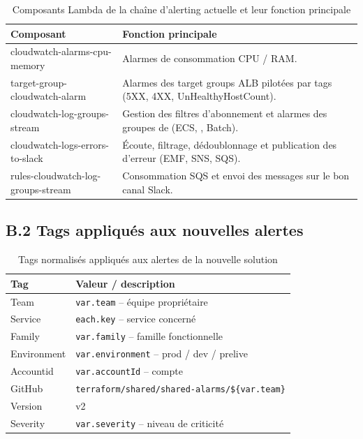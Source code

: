 \begin{table}[h]
	\centering
	\caption{Composants Lambda de la chaîne d'alerting actuelle et leur fonction principale}
	\label{tab:annexe-composants-lambda}
	\begin{tabular}{|p{}|p{}|}
		\hline
		\textbf{Composant} & \textbf{Fonction principale} \\
		\hline
		cloudwatch-alarms-cpu-memory & Alarmes de consommation CPU / RAM. \\
		\hline
		target-group-cloudwatch-alarm & Alarmes des target groups ALB pilotées par tags (5XX, 4XX, UnHealthyHostCount). \\
		\hline
		cloudwatch-log-groups-stream & Gestion des filtres d'abonnement et alarmes des groupes de \lexique{logs} (ECS, \lexique{Lambda}, Batch). \\
		\hline
		cloudwatch-logs-errors-to-slack & Écoute, filtrage, dédoublonnage et publication des \lexique{logs} d'erreur (EMF, SNS, SQS). \\
		\hline
		rules-cloudwatch-log-groups-stream & Consommation SQS et envoi des messages sur le bon canal Slack. \\
		\hline
	\end{tabular}
\end{table}

\subsection*{B.2 Tags appliqués aux nouvelles alertes}

\begin{table}[h]
	\centering
	\caption{Tags normalisés appliqués aux alertes de la nouvelle solution}
	\label{tab:annexe-tags}
	\begin{tabular}{|p{}|p{}|}
		\hline
		\textbf{Tag} & \textbf{Valeur / description} \\
		\hline
		Team & \texttt{var.team} -- équipe propriétaire \\
		\hline
		Service & \texttt{each.key} -- service concerné \\
		\hline
		Family & \texttt{var.family} -- famille fonctionnelle \\
		\hline
		Environment & \texttt{var.environment} -- prod / dev / prelive \\
		\hline
		Accountid & \texttt{var.accountId} -- compte \lexique{AWS} \\
		\hline
		GitHub & \texttt{terraform/shared/shared-alarms/\$\{var.team\}} \\
		\hline
		Version & v2 \\
		\hline
		Severity & \texttt{var.severity} -- niveau de criticité \\
		\hline
	\end{tabular}
\end{table}


